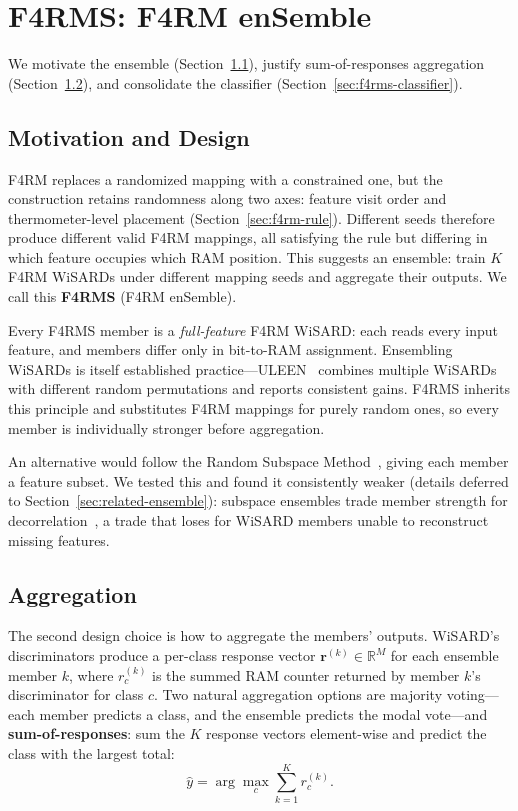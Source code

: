 \documentclass[runningheads]{llncs}
\begin{document}
\section{F4RMS: F4RM enSemble}
\label{sec:f4rms}

We motivate the ensemble (Section~\ref{sec:f4rms-motivation}), justify sum-of-responses aggregation (Section~\ref{sec:f4rms-aggregation}), and consolidate the classifier (Section~\ref{sec:f4rms-classifier}).

\subsection{Motivation and Design}
\label{sec:f4rms-motivation}

F4RM replaces a randomized mapping with a constrained one, but the construction retains randomness along two axes: feature visit order and thermometer-level placement (Section~\ref{sec:f4rm-rule}). Different seeds therefore produce different valid F4RM mappings, all satisfying the rule but differing in which feature occupies which RAM position. This suggests an ensemble: train $K$ F4RM WiSARDs under different mapping seeds and aggregate their outputs. We call this \textbf{F4RMS} (F4RM enSemble).

Every F4RMS member is a \emph{full-feature} F4RM WiSARD: each reads every input feature, and members differ only in bit-to-RAM assignment. Ensembling WiSARDs is itself established practice---ULEEN~\cite{susskind2023uleen} combines multiple WiSARDs with different random permutations and reports consistent gains. F4RMS inherits this principle and substitutes F4RM mappings for purely random ones, so every member is individually stronger before aggregation.

An alternative would follow the Random Subspace Method~\cite{ho1998random}, giving each member a feature subset. We tested this and found it consistently weaker (details deferred to Section~\ref{sec:related-ensemble}): subspace ensembles trade member strength for decorrelation~\cite{breiman2001random}, a trade that loses for WiSARD members unable to reconstruct missing features.

\subsection{Aggregation}
\label{sec:f4rms-aggregation}

The second design choice is how to aggregate the members' outputs. WiSARD's discriminators produce a per-class response vector $\mathbf{r}^{(k)} \in \mathbb{R}^M$ for each ensemble member $k$, where $r^{(k)}_c$ is the summed RAM counter returned by member $k$'s discriminator for class $c$. Two natural aggregation options are majority voting---each member predicts a class, and the ensemble predicts the modal vote---and \textbf{sum-of-responses}: sum the $K$ response vectors element-wise and predict the class with the largest total:
\begin{equation}
\hat{y} = \arg\max_c \sum_{k=1}^{K} r^{(k)}_c.
\label{eq:sum-of-responses}
\end{equation}
\end{document}

